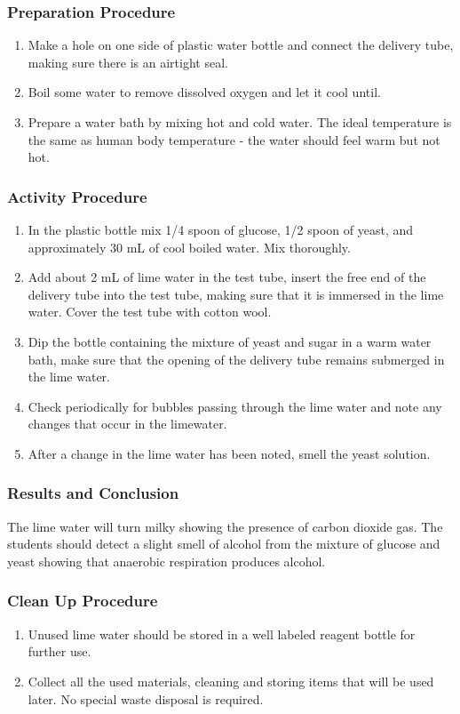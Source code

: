\subsubsection*{Preparation Procedure}
\begin{enumerate}
\item{Make a hole on one side of plastic water bottle and connect the delivery tube, making sure there is an airtight seal.}
\item{Boil some water to remove dissolved oxygen and let it cool until.}
\item{Prepare a water bath by mixing hot and cold water. The ideal temperature is the same as human body temperature - the water should feel warm but not hot.}
\end{enumerate}

\subsubsection*{Activity Procedure}
\begin{enumerate}
\item{In the plastic bottle mix 1/4 spoon of glucose, 1/2 spoon of yeast, and approximately 30 mL of cool boiled water. Mix thoroughly.}
\item{Add about 2 mL of lime water in the test tube, insert the free end of the delivery tube into the test tube, making sure that it is immersed in the lime water. Cover the test tube with cotton wool.}
\item{Dip the bottle containing the mixture of yeast and sugar in a warm water bath, make sure that the opening of the delivery tube remains submerged in the lime water.}
\item{Check periodically for bubbles passing through the lime water and note any changes that occur in the limewater.}
\item{After a change in the lime water has been noted, smell the yeast solution.}
\end{enumerate}

\subsubsection*{Results and Conclusion}
The lime water will turn milky showing the presence of carbon dioxide gas.
The students should detect a slight smell of alcohol from the mixture of glucose and yeast showing that anaerobic respiration produces alcohol.

\subsubsection*{Clean Up Procedure}
\begin{enumerate}
\item{Unused lime water should be stored in a well labeled reagent bottle for further use.}
\item{Collect all the used materials, cleaning and storing items that will be used later. No special waste disposal is required.}
\end{enumerate}

